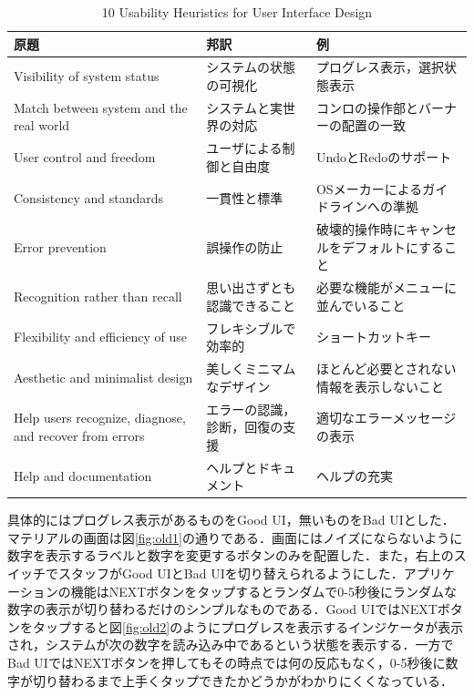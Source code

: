 \begin{landscape}
\begin{table}[htbp]
\centering
\begin{tabular}{lll}
\hline
原題                                                      & 邦訳              & 例                       \\ \hline
Visibility of system status                             & システムの状態の可視化     & プログレス表示，選択状態表示          \\
Match between system and the real world                 & システムと実世界の対応     & コンロの操作部とバーナーの配置の一致      \\
User control and freedom                                & ユーザによる制御と自由度    & UndoとRedoのサポート          \\
Consistency and standards                               & 一貫性と標準          & OSメーカーによるガイドラインへの準拠     \\
Error prevention                                        & 誤操作の防止          & 破壊的操作時にキャンセルをデフォルトにすること \\
Recognition rather than recall                          & 思い出さずとも認識できること  & 必要な機能がメニューに並んでいること      \\
Flexibility and efficiency of use                       & フレキシブルで効率的      & ショートカットキー               \\
Aesthetic and minimalist design                         & 美しくミニマムなデザイン    & ほとんど必要とされない情報を表示しないこと   \\
Help users recognize, diagnose, and recover from errors & エラーの認識，診断，回復の支援 & 適切なエラーメッセージの表示          \\
Help and documentation                                  & ヘルプとドキュメント      & ヘルプの充実                  \\ \hline
\end{tabular}
\caption{10 Usability Heuristics for User Interface Design\cite{nngroup}}
\label{table:heuristics}
\end{table}
\end{landscape}

具体的にはプログレス表示があるものをGood UI，無いものをBad UIとした．マテリアルの画面は図\ref{fig:old1}の通りである．画面にはノイズにならないように数字を表示するラベルと数字を変更するボタンのみを配置した．また，右上のスイッチでスタッフがGood UIとBad UIを切り替えられるようにした．アプリケーションの機能はNEXTボタンをタップするとランダムで0-5秒後にランダムな数字の表示が切り替わるだけのシンプルなものである．Good UIではNEXTボタンをタップすると図\ref{fig:old2}のようにプログレスを表示するインジケータが表示され，システムが次の数字を読み込み中であるという状態を表示する．一方でBad UIではNEXTボタンを押してもその時点では何の反応もなく，0-5秒後に数字が切り替わるまで上手くタップできたかどうかがわかりにくくなっている．

